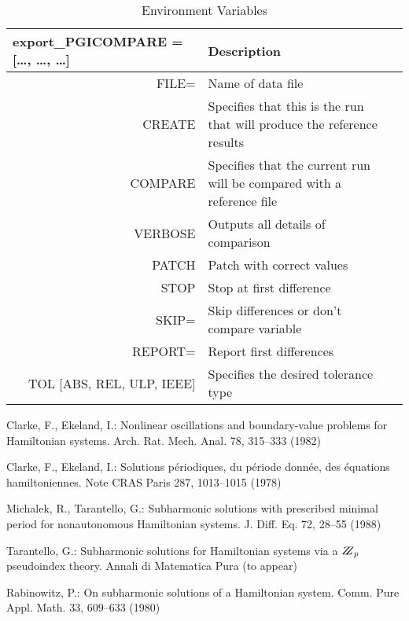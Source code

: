\documentclass{llncs}
\begin{document}
\begin{table}
\caption{Environment Variables }
\begin{center}
\begin{tabular}{r@{\quad}ll}
\hline
\multicolumn{1}{l}{\rule{0pt}{12pt} export\_PGICOMPARE = […, …, …] 
}&\multicolumn{2}{l}{  Description }\\[2pt]
\hline\rule{0pt}{12pt}
FILE= & Name of data file & \\
CREATE   &   Specifies that this is the run that will produce the reference results& \\
COMPARE   &   Specifies that the current run will be compared with a reference file& \\
VERBOSE   & Outputs all details of comparison& \\
PATCH   &   Patch with correct values& \\
STOP   &   Stop at first difference & \\
SKIP=    & Skip differences or don’t compare variable & \\
REPORT=    & Report first differences & \\
TOL [ABS, REL, ULP, IEEE]  & Specifies the desired tolerance type &\\[2pt]
\hline
\end{tabular}
\end{center}
\end{table}




%
%
%
\begin{thebibliography}{5}
%
Clarke, F., Ekeland, I.:
Nonlinear oscillations and
boundary-value problems for Hamiltonian systems.
Arch. Rat. Mech. Anal. 78, 315--333 (1982)

Clarke, F., Ekeland, I.:
Solutions p\'{e}riodiques, du
p\'{e}riode donn\'{e}e, des \'{e}quations hamiltoniennes.
Note CRAS Paris 287, 1013--1015 (1978)

Michalek, R., Tarantello, G.:
Subharmonic solutions with prescribed minimal
period for nonautonomous Hamiltonian systems.
J. Diff. Eq. 72, 28--55 (1988)

Tarantello, G.:
Subharmonic solutions for Hamiltonian
systems via a $\bbbz_{p}$ pseudoindex theory.
Annali di Matematica Pura (to appear)

Rabinowitz, P.:
On subharmonic solutions of a Hamiltonian system.
Comm. Pure Appl. Math. 33, 609--633 (1980)

\end{thebibliography}
\end{document}
